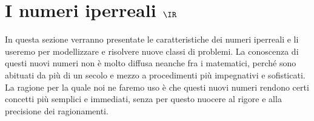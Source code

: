 


\section{I numeri iperreali $\IR$}
\label{sec:insnum_iperreali}

In questa sezione verranno presentate le caratteristiche dei numeri 
iperreali e li useremo per modellizzare e risolvere nuove classi di 
problemi. 
La conoscenza di questi nuovi numeri non è molto diffusa neanche fra i 
matematici, perché sono abituati da più di un secolo e mezzo a procedimenti 
più impegnativi e sofisticati.
La ragione per la quale noi ne faremo uso è che questi nuovi numeri 
rendono certi concetti più semplici e immediati, senza per questo nuocere al 
rigore e alla precisione dei ragionamenti.

% 
% 

